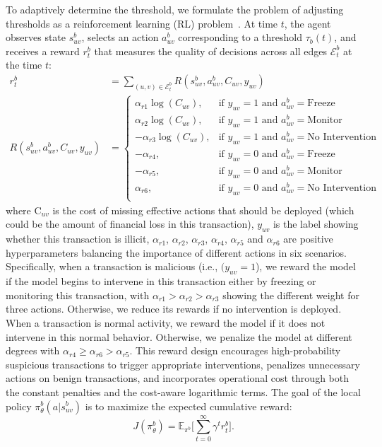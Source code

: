 To adaptively determine the threshold, we formulate the problem of adjusting thresholds as a reinforcement learning (RL) problem~\parencite{li2017deep, szepesvari2022algorithms, ladosz2022exploration}. At time $t$, the agent observes state $s_{uv}^b$, selects an action $a_{uv}^b$ corresponding to a threshold $\tau_b(t)$, and receives a reward $r_t^b$ that measures the quality of decisions across all edges $\mathcal{E}^{b}_t$ at the time $t$:
\begin{align}
    r_t^b &= \sum_{(u,v)\in \mathcal{E}^{b}_t} R(s_{uv}^b, a_{uv}^b, C_{uv}, y_{uv}) \\
    R(s_{uv}^b, a_{uv}^b, C_{uv}, y_{uv}) &= 
    \begin{cases}
        \alpha_{r1}\log(C_{uv}), & \text{if } y_{uv}=1 \text{ and } a_{uv}^b = \text{Freeze}   \\
        \alpha_{r2}\log(C_{uv}), & \text{if } y_{uv}=1 \text{ and } a_{uv}^b = \text{Monitor} \\
        -\alpha_{r3}\log(C_{uv}), & \text{if } y_{uv}=1 \text{ and } a_{uv}^b = \text{No Intervention} \\
        -\alpha_{r4}, & \text{if } y_{uv}=0 \text{ and } a_{uv}^b = \text{Freeze}   \\
        -\alpha_{r5}, & \text{if } y_{uv}=0 \text{ and } a_{uv}^b = \text{Monitor} \\
        \alpha_{r6}, & \text{if } y_{uv}=0 \text{ and } a_{uv}^b = \text{No Intervention} \\
     \end{cases}
\end{align}
where $\text{C}_{uv}$ is the cost of missing effective actions that should be deployed (which could be the amount of financial loss in this transaction), $y_{uv}$ is the label showing whether this transaction is illicit, $\alpha_{r1}$, $\alpha_{r2}$, $\alpha_{r3}$, $\alpha_{r4}$, $\alpha_{r5}$ and $\alpha_{r6}$ are positive hyperparameters balancing the importance of different actions in six scenarios. Specifically, when a transaction is malicious (i.e.,  $(y_{uv}=1$), we reward the model if the model begins to intervene in this transaction either by freezing or monitoring this transaction, with $\alpha_{r1} > \alpha_{r2} > \alpha_{r3}$ showing the different weight for three actions. Otherwise, we reduce its rewards if no intervention is deployed. When a transaction is normal activity, we reward the model if it does not intervene in this normal behavior. Otherwise, we penalize the model at different degrees with $\alpha_{r4} \geq \alpha_{r6} >\alpha_{r5}$. This reward design encourages high-probability suspicious transactions to trigger appropriate interventions, penalizes unnecessary actions on benign transactions, and incorporates operational cost through both the constant penalties and the cost-aware logarithmic terms. The goal of the local policy $\pi_\theta^b(a|s_{uv}^b)$ is to maximize the expected cumulative reward:
\begin{equation}
    J(\pi_\theta^b) = \mathbb{E}_{\pi^b}\!\Big[\sum_{t=0}^{\infty} \gamma^t r_t^b \Big].
\end{equation}

